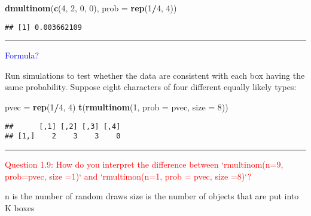 \documentclass[]{article}
\newenvironment{Shaded}{\begin{snugshade}}{\end{snugshade}}
\newcommand{\KeywordTok}[1]{\textcolor[rgb]{0.13,0.29,0.53}{\textbf{#1}}}
\newcommand{\DataTypeTok}[1]{\textcolor[rgb]{0.13,0.29,0.53}{#1}}
\newcommand{\DecValTok}[1]{\textcolor[rgb]{0.00,0.00,0.81}{#1}}
\newcommand{\StringTok}[1]{\textcolor[rgb]{0.31,0.60,0.02}{#1}}
\newcommand{\CommentTok}[1]{\textcolor[rgb]{0.56,0.35,0.01}{\textit{#1}}}
\newcommand{\OperatorTok}[1]{\textcolor[rgb]{0.81,0.36,0.00}{\textbf{#1}}}
\newcommand{\NormalTok}[1]{#1}
\let\oldrule=\rule
\renewcommand{\rule}[1]{\oldrule{\linewidth}}
\begin{document}
\begin{Shaded}
\begin{Highlighting}[]
\KeywordTok{dmultinom}\NormalTok{(}\KeywordTok{c}\NormalTok{(}\DecValTok{4}\NormalTok{, }\DecValTok{2}\NormalTok{, }\DecValTok{0}\NormalTok{, }\DecValTok{0}\NormalTok{), }\DataTypeTok{prob =} \KeywordTok{rep}\NormalTok{(}\DecValTok{1}\OperatorTok{/}\DecValTok{4}\NormalTok{, }\DecValTok{4}\NormalTok{))}
\end{Highlighting}
\end{Shaded}

\begin{verbatim}
## [1] 0.003662109
\end{verbatim}

\begin{center}\rule{0.5\linewidth}{\linethickness}\end{center}

\textcolor{blue}{Formula?}

Run simulations to test whether the data are consistent with each box
having the same probability. Suppose eight characters of four different
equally likely types:

\begin{Shaded}
\begin{Highlighting}[]
\NormalTok{pvec =}\StringTok{ }\KeywordTok{rep}\NormalTok{(}\DecValTok{1}\OperatorTok{/}\DecValTok{4}\NormalTok{, }\DecValTok{4}\NormalTok{)}
\KeywordTok{t}\NormalTok{(}\KeywordTok{rmultinom}\NormalTok{(}\DecValTok{1}\NormalTok{, }\DataTypeTok{prob =}\NormalTok{ pvec, }\DataTypeTok{size =} \DecValTok{8}\NormalTok{))}
\end{Highlighting}
\end{Shaded}

\begin{verbatim}
##      [,1] [,2] [,3] [,4]
## [1,]    2    3    3    0
\end{verbatim}

\begin{center}\rule{0.5\linewidth}{\linethickness}\end{center}

\textcolor{red}{Question 1.9: How do you interpret the difference between `rmultinom(n=9, prob=pvec, size =1)` and `rmultimon(n=1, prob = pvec, size =8)`?}

n is the number of random draws size is the number of objects that are
put into K boxes

\begin{Shaded}
\end{Shaded}
\end{document}

